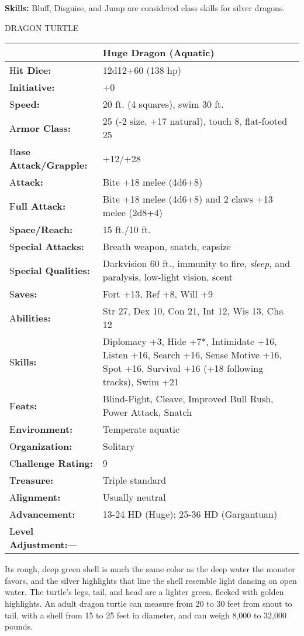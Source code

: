 \documentclass{article}
\begin{document}
{\textbf{Skills: }Bluff, Disguise, and Jump are considered class skills for silver 
dragons.

\vspace{12pt}
{\LARGE{}DRAGON TURTLE}

\begin{tabular}{|>{\raggedright}p{91pt}|>{\raggedright}p{202pt}|}
\hline
  & Huge Dragon (Aquatic)\tabularnewline
\hline
H\textbf{it Dice:} & 12d12+60 (138 hp)\tabularnewline
\hline
I\textbf{nitiative:} & +0\tabularnewline
\hline
S\textbf{peed:} & 20 ft. (4 squares), swim 30 ft.\tabularnewline
\hline
A\textbf{rmor Class:} & 25 (-2 size, +17 natural), touch 8, flat-footed 25\tabularnewline
\hline
B\textbf{ase Attack/Grapple:} & +12/+28\tabularnewline
\hline
A\textbf{ttack:} & Bite +18 melee (4d6+8)\tabularnewline
\hline
F\textbf{ull Attack:} & Bite +18 melee (4d6+8) and 2 claws +13 melee (2d8+4)\tabularnewline
\hline
S\textbf{pace/Reach:} & 15 ft./10 ft.\tabularnewline
\hline
S\textbf{pecial Attacks:} & Breath weapon, snatch, capsize\tabularnewline
\hline
S\textbf{pecial Qualities:} & Darkvision 60 ft., immunity to fire, \textit{sleep, 
}and paralysis, low-light vision, scent\tabularnewline
\hline
S\textbf{aves:} & Fort +13, Ref +8, Will +9\tabularnewline
\hline
A\textbf{bilities:} & Str 27, Dex 10, Con 21, Int 12, Wis 13, Cha 12\tabularnewline
\hline
S\textbf{kills:} & Diplomacy +3, Hide +7*, Intimidate +16, Listen +16, Search +16, 
Sense Motive +16, Spot +16, Survival +16 (+18 following tracks), Swim +21\tabularnewline
\hline
F\textbf{eats:} & Blind-Fight, Cleave, Improved Bull Rush, Power Attack, Snatch\tabularnewline
\hline
E\textbf{nvironment:} & Temperate aquatic\tabularnewline
\hline
O\textbf{rganization:} & Solitary\tabularnewline
\hline
C\textbf{hallenge Rating:} & 9\tabularnewline
\hline
T\textbf{reasure:} & Triple standard\tabularnewline
\hline
A\textbf{lignment:} & Usually neutral\tabularnewline
\hline
A\textbf{dvancement:} & 13-24 HD (Huge); 25-36 HD (Gargantuan)\tabularnewline
\hline
L\textbf{evel Adjustment:}--- & \tabularnewline
\hline
\end{tabular}

Its rough, deep green shell is much the same color as the deep water the monster 
favors, and the silver highlights that line the shell resemble light dancing on 
open water. The turtle's legs, tail, and head are a lighter green, flecked with 
golden highlights. An adult dragon turtle can measure from 20 to 30 feet from snout 
to tail, with a shell from 15 to 25 feet in diameter, and can weigh 8,000 to 32,000 
pounds.

}
\end{document}
